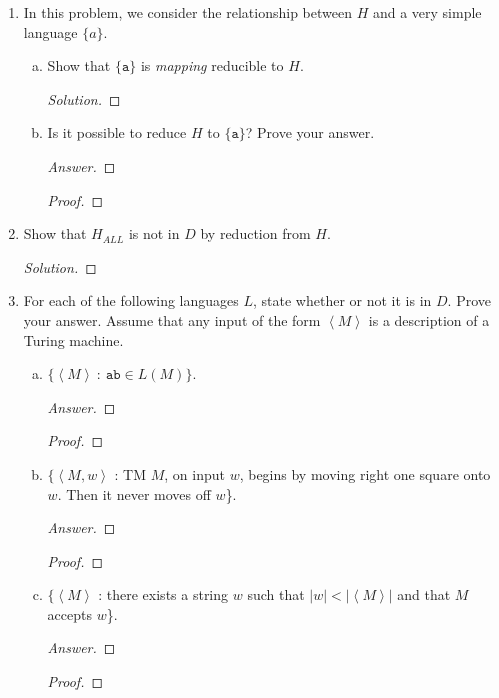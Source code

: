 \documentclass[10pt]{article}
\newcommand{\card}[1]{\left| #1 \right|}
\newcommand{\brackets}[1]{\left< #1 \right>}
\begin{document}
\begin{enumerate}[1)]

\item
In this problem, we consider the relationship between $H$ and a very simple language $\{a\}$.
\begin{enumerate}[a)]

\item
Show that $\{\texttt{a}\}$ is \emph{mapping} reducible to $H$.  
\begin{proof}[Solution]
\end{proof}

\item
Is it possible to reduce $H$ to $\{\texttt{a}\}$?  Prove your answer.
\begin{proof}[Answer]
\end{proof}
\begin{proof}[Proof]
\end{proof}
\end{enumerate}


\item
Show that $H_{ALL}$ is not in $D$ by reduction from $H$.
\begin{proof}[Solution]
\end{proof}



\item
For each of the following languages $L$, state whether or not it is in $D$.  Prove your answer.  Assume that any input of the form $\brackets{M}$ is a description of a Turing machine.
\begin{enumerate}[a)]

\item
$\{\brackets{M}\ :\ \texttt{ab} \in L(M)\}$.
\begin{proof}[Answer]
\end{proof}
\begin{proof}[Proof]
\end{proof}

\item
$\{\brackets{M, w}$ : TM $M$, on input $w$, begins by moving right one square onto $w$.  Then it never moves off $w$\}.
\begin{proof}[Answer]
\end{proof}
\begin{proof}[Proof]
\end{proof}

\item
$\{\brackets{M}$ : there exists a string $w$ such that $\card{w} < \card{\brackets{M}}$ and that $M$ accepts $w$\}.
\begin{proof}[Answer]
\end{proof}
\begin{proof}[Proof]
\end{proof}
\end{enumerate}


\end{enumerate}
\end{document}

